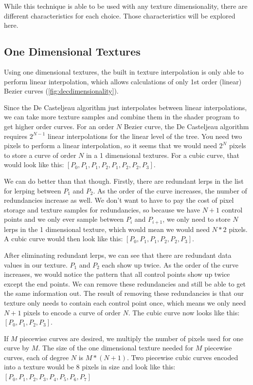 \documentclass{jcgt}
\begin{document}
While this technique is able to be used with any texture dimensionality, there are different characteristics for each choice.  Those characteristics will be explored here.

\subsection{One Dimensional Textures}

Using one dimensional textures, the built in texture interpolation is only able to perform linear interpolation, which allows calculations of only 1st order (linear) Bezier curves (\autoref{fig:decdimensionality}).

Since the De Casteljeau algorithm just interpolates between linear interpolations, we can take more texture samples and combine them in the shader program to get higher order curves.  For an order $N$ Bezier curve, the De Casteljeau algorithm requires $2^{N-1}$ linear interpolations for the linear level of the tree.  You need two pixels to perform a linear interpolation, so it seems that we would need $2^N$ pixels to store a curve of order $N$ in a 1 dimensional textures.  For a cubic curve, that would look like this: $[P_0,P_1,P_1,P_2,P_1,P_2,P_2,P_3]$.

We can do better than that though.  Firstly, there are redundant lerps in the list for lerping between $P_1$ and $P_2$.  As the order of the curve increases, the number of redundancies increase as well.  We don't want to have to pay the cost of pixel storage and texture samples for redundancies, so because we have $N+1$ control points and we only ever sample between  $P_i$ and $P_{i+1}$, we only need to store $N$ lerps in the 1 dimensional texture, which would mean we would need $N*2$ pixels.  A cubic curve would then look like this:  $[P_0,P_1,P_1,P_2,P_2,P_3]$.

After eliminating redundant lerps, we can see that there are redundant data values in our texture.  $P_1$ and $P_2$ each show up twice.  As the order of the curve increases, we would notice the pattern that all control points show up twice except the end points.  We can remove these redundancies and still be able to get the same information out.  The result of removing these redundancies is that our texture only needs to contain each control point once, which means we only need $N+1$ pixels to encode a curve of order $N$.  The cubic curve now looks like this: $[P_0,P_1,P_2,P_3]$. 

If $M$ piecewise curves are desired, we multiply the number of pixels used for one curve by $M$.  The size of the one dimensional texture needed for $M$ piecewise curves, each of degree $N$ is $M*(N+1)$. Two piecewise cubic curves encoded into a texture would be 8 pixels in size and look like this: $[P_0,P_1,P_2,P_3,P_4,P_5,P_6,P_7]$
\end{document}
